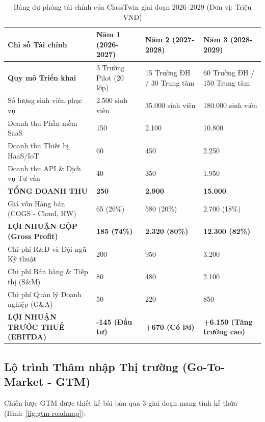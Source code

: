 \begin{table}[htbp]
  \centering\small
  \caption{Bảng dự phóng tài chính của ClassTwin giai đoạn 2026--2029 (Đơn vị: Triệu VNĐ)}\label{tab:financial-projections}
  \begin{tabularx}{\textwidth}{l X X X}
    \toprule
    \textbf{Chỉ số Tài chính} & \textbf{Năm 1 (2026-2027)} & \textbf{Năm 2 (2027-2028)} & \textbf{Năm 3 (2028-2029)} \\
    \midrule
    \textbf{Quy mô Triển khai} & 3 Trường Pilot (20 lớp) & 15 Trường ĐH / 30 Trung tâm & 60 Trường ĐH / 150 Trung tâm \\
    Số lượng sinh viên phục vụ & 2.500 sinh viên & 35.000 sinh viên & 180.000 sinh viên \\
    \midrule
    Doanh thu Phần mềm SaaS & 150 & 2.100 & 10.800 \\
    Doanh thu Thiết bị HaaS/IoT & 60 & 450 & 2.250 \\
    Doanh thu API \& Dịch vụ Tư vấn & 40 & 350 & 1.950 \\
    \textbf{TỔNG DOANH THU} & \textbf{250} & \textbf{2.900} & \textbf{15.000} \\
    \midrule
    Giá vốn Hàng bán (COGS - Cloud, HW) & 65 (26\%) & 580 (20\%) & 2.700 (18\%) \\
    \textbf{LỢI NHUẬN GỘP (Gross Profit)} & \textbf{185 (74\%)} & \textbf{2.320 (80\%)} & \textbf{12.300 (82\%)} \\
    \midrule
    Chi phí R\&D và Đội ngũ Kỹ thuật & 200 & 950 & 3.200 \\
    Chi phí Bán hàng \& Tiếp thị (S\&M) & 80 & 480 & 2.100 \\
    Chi phí Quản lý Doanh nghiệp (G\&A) & 50 & 220 & 850 \\
    \midrule
    \textbf{LỢI NHUẬN TRƯỚC THUẾ (EBITDA)} & \textbf{-145 (Đầu tư)} & \textbf{+670 (Có lãi)} & \textbf{+6.150 (Tăng trưởng cao)} \\
    \bottomrule
  \end{tabularx}
\end{table}

\subsection{Lộ trình Thâm nhập Thị trường (Go-To-Market - GTM)}\label{subsec:gtm-strategy}
Chiến lược GTM được thiết kế bài bản qua 3 giai đoạn mang tính kế thừa (Hình~\ref{fig:gtm-roadmap}):

